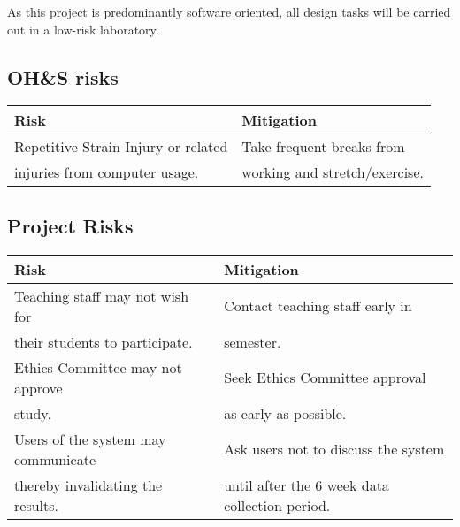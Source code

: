 As this project is predominantly software oriented, all design tasks will be carried
out in a low-risk laboratory.
\subsection{OH\&S risks}
\begin{tabular}{ l | l }
	Risk  &  Mitigation \\
	\hline
	\hline
	Repetitive Strain Injury or related  & Take frequent breaks from     \\
	injuries from computer usage.         & working and stretch/exercise. \\
	\hline
\end{tabular}
\subsection{Project Risks}
\begin{tabular}{ l | l }
	Risk  & Mitigation  \\
	\hline
	\hline
	Teaching staff may not wish for      & Contact teaching staff early in  \\
	their students to participate.       & semester. \\
	\hline
	Ethics Committee may not approve     & Seek Ethics Committee approval  \\
	study.                               & as early as possible.           \\
	\hline
	Users of the system may communicate     & Ask users not to discuss the system \\
	thereby invalidating the results.       & until after the 6 week data collection period.\\
	\hline
\end{tabular}
